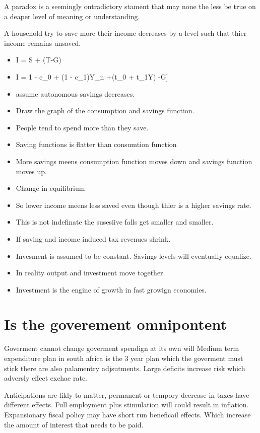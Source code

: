 \documentclass[twocolumn]{article}
\providecommand{\tightlist}{%
  \setlength{\itemsep}{0pt}\setlength{\parskip}{0pt}}
\begin{document}
A paradox is a seemingly ontradictory stament that may none the less be
true on a deaper level of meaning or understanding.

A household try to save more their income decreases by a level such that
thier income remains unsaved.

\begin{itemize}
\tightlist
\item
  I = S + (T-G)
\item
  I = 1 - c\_0 + (1 - c\_1)Y\_n +(t\_0 + t\_1Y) -G{]}
\item
  assume autonomous savings decreases.
\item
  Draw the graph of the consumption and savings function.
\item
  People tend to spend more than they save.
\item
  Saving functions is flatter than consumtion function
\item
  More savings meens consumption function moves down and savings
  function moves up.
\item
  Change in equilibrium
\item
  So lower income meens less saved even though thier is a higher savings
  rate.
\item
  This is not indefinate the susesiive falls get smaller and smaller.
\item
  If saving and income induced tax revenues shrink.
\item
  Invesment is assumed to be constant. Savings levels will eventually
  equalize.
\item
  In reality output and investment move together.
\item
  Investment is the engine of growth in fast growign economies.
\end{itemize}

\hypertarget{is-the-goverement-omnipontent}{%
\section{Is the goverement
omnipontent}\label{is-the-goverement-omnipontent}}

Goverment cannot change goverment spendign at its own will Medium term
expenditure plan in south africa is the 3 year plan which the goverment
must stick there are also palamentry adjsutments. Large deficits
increase risk which adversly effect exchae rate.

Anticipations are likly to matter, permanent or tempory decrease in
taxes have different effects. Full employment plus stimulation will
could result in inflation. Expansionary fiscal policy may have short run
beneficail effects. Which increase the amount of interest that needs to
be paid.
\end{document}
